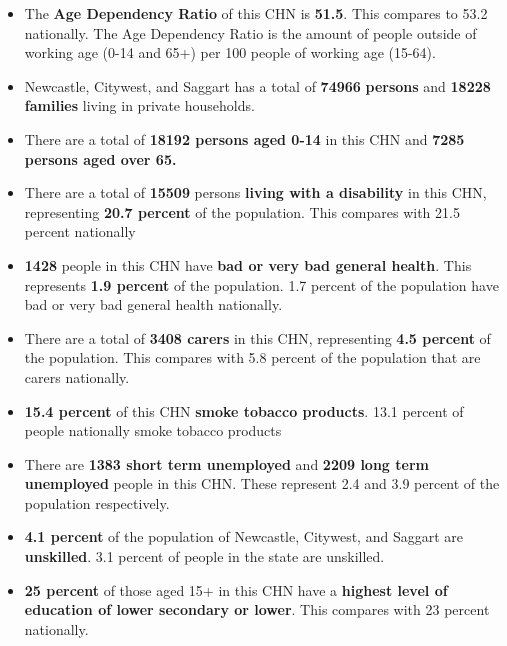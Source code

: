 \documentclass{article}
\begin{document}
\begin{itemize}

\item The \textbf{Age Dependency Ratio} of this CHN is  \textbf{51.5}. This compares to 53.2 nationally. The Age Dependency Ratio is the amount of people outside of working age (0-14 and 65+) per 100 people of working age (15-64). 

\item Newcastle, Citywest, and Saggart has a total of \textbf{\num{74966}} \textbf{persons} and  \textbf{\num{18228}} \textbf{families} living in private households.

\item There are a total of \textbf{\num{18192} persons aged 0-14} in this CHN and \textbf{\num{7285} persons aged over 65.} 

\item There are a total of \textbf{\num{15509}} persons \textbf{living with a disability} in this CHN, representing \textbf{20.7 percent} of the population. This compares with  21.5 percent nationally

\item \textbf{\num{1428}} people in this CHN have \textbf{bad or very bad general health}. This represents \textbf{1.9 percent} of the population. 1.7 percent of the population have bad or very bad general health nationally. 

\item There are a total of \textbf{\num{3408} carers} in this CHN, representing \textbf{4.5 percent} of the population. This compares with 5.8 percent of the population that are carers nationally. 

\item \textbf{15.4 percent} of this CHN \textbf{smoke tobacco products}. 13.1 percent of people nationally smoke tobacco products

\item There are \textbf{\num{1383} short term unemployed} and \textbf{\num{2209} long term unemployed} people in this CHN. These represent 2.4 and 3.9 percent of the population respectively.

\item  \textbf{4.1 percent} of the population of Newcastle, Citywest, and Saggart are \textbf{unskilled}. 3.1 percent of people in the state are unskilled.

\item \textbf{25 percent} of those aged 15+ in this CHN have a \textbf{highest level of education of lower secondary or lower}. This compares with 23 percent nationally. 


\end{itemize}
\end{document}

